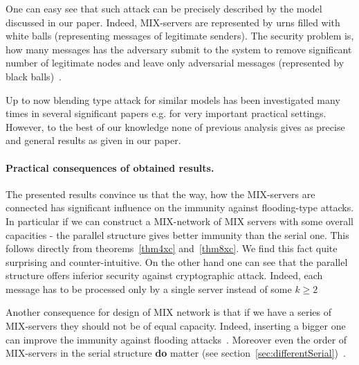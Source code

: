 \documentclass[submission]{dmtcs}
\newcommand{\Marek} [1]{\marginpar{\scriptsize {\bf MKlo}:#1}}
\begin{document}
\medskip

One can easy see that such  attack can be precisely described by the model discussed in our paper. Indeed, MIX-servers are represented by urns filled with white balls (representing messages of legitimate senders). The security problem is, how many messages has the adversary submit to the system to remove significant number of legitimate nodes and leave only adversarial messages (represented by black balls)~.

Up to now blending type attack for similar models has been investigated many times in several significant papers e.g. \cite{IH05,tic,lat} for very important practical settings. However, to the best of our knowledge none of previous analysis gives as precise and general  results as given in our paper.


\paragraph{Practical consequences of obtained results.} The presented results convince us that the way, how the MIX-servers are connected has significant influence on the immunity against flooding-type attacks. In particular if we can construct a MIX-network of MIX servers with some overall capacities
- the parallel structure gives better immunity than the serial one.  This follows directly from  theorems~\ref{thm4xc} and~\ref{thm8xc}.  
We find this fact quite  surprising and counter-intuitive. On the other hand one can see that the parallel structure offers inferior security against cryptographic attack. Indeed, each message has to be processed only by a single server instead of some $k\geq 2$ 

Another consequence for design of MIX network is that if we have a series of MIX-servers they should not be of equal capacity. Indeed,  inserting a bigger one can improve the immunity against flooding attacks~. 
Moreover even the order of MIX-servers in the serial structure \textbf{do}  matter  (see section~\ref{sec:differentSerial})~.    



 

%




\end{document}
